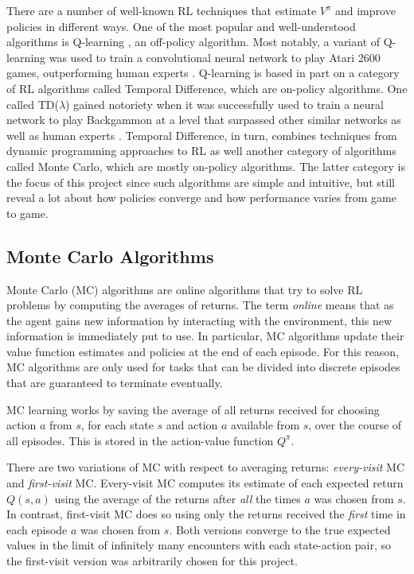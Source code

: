 \documentclass[11pt,a4paper]{report}
\begin{document}
There are a number of well-known RL techniques that estimate $V^{\pi}$ and improve policies in different ways. One of the most popular and well-understood \cite{challenges-of-rl} algorithms is Q-learning \cite{q-learning}, an off-policy algorithm. Most notably, a variant of Q-learning was used to train a convolutional neural network to play Atari 2600 games, outperforming human experts \cite{atari}. Q-learning is based in part on a category of RL algorithms called Temporal Difference, which are on-policy algorithms. One called TD($\lambda$) gained notoriety when it was successfully used to train a neural network to play Backgammon at a level that surpassed other similar networks as well as human experts \cite{backgammon}. Temporal Difference, in turn, combines techniques from dynamic programming approaches to RL as well another category of algorithms called Monte Carlo, which are mostly on-policy algorithms. The latter category is the focus of this project since such algorithms are simple and intuitive, but still reveal a lot about how policies converge and how performance varies from game to game.


\subsection{Monte Carlo Algorithms}
\label{sec:MonteCarloAlgorithms}

Monte Carlo (MC) algorithms are online algorithms that try to solve RL problems by computing the averages of returns. The term \emph{online} means that as the agent gains new information by interacting with the environment, this new information is immediately put to use. In particular, MC algorithms update their value function estimates and policies at the end of each episode. For this reason, MC algorithms are only used for tasks that can be divided into discrete episodes that are guaranteed to terminate eventually.

MC learning works by saving the average of all returns received for choosing action $a$ from $s$, for each state $s$ and action $a$ available from $s$, over the course of all episodes. This is stored in the action-value function $Q^{\pi}$.

There are two variations of MC with respect to averaging returns: \emph{every-visit} MC and \emph{first-visit} MC. Every-visit MC computes its estimate of each expected return $Q(s,a)$ using the average of the returns after \emph{all} the times $a$ was chosen from $s$. In contrast, first-visit MC does so using only the returns received the \emph{first} time in each episode $a$ was chosen from $s$. Both versions converge to the true expected values in the limit of infinitely many encounters with each state-action pair, so the first-visit version was arbitrarily chosen for this project.
\end{document}
